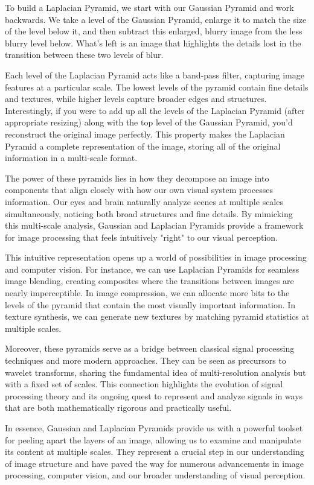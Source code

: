 To build a Laplacian Pyramid, we start with our Gaussian Pyramid and work backwards. We take a level of the Gaussian Pyramid, enlarge it to match the size of the level below it, and then subtract this enlarged, blurry image from the less blurry level below. What's left is an image that highlights the details lost in the transition between these two levels of blur.

Each level of the Laplacian Pyramid acts like a band-pass filter, capturing image features at a particular scale. The lowest levels of the pyramid contain fine details and textures, while higher levels capture broader edges and structures. Interestingly, if you were to add up all the levels of the Laplacian Pyramid (after appropriate resizing) along with the top level of the Gaussian Pyramid, you'd reconstruct the original image perfectly. This property makes the Laplacian Pyramid a complete representation of the image, storing all of the original information in a multi-scale format.

The power of these pyramids lies in how they decompose an image into components that align closely with how our own visual system processes information. Our eyes and brain naturally analyze scenes at multiple scales simultaneously, noticing both broad structures and fine details. By mimicking this multi-scale analysis, Gaussian and Laplacian Pyramids provide a framework for image processing that feels intuitively "right" to our visual perception.

This intuitive representation opens up a world of possibilities in image processing and computer vision. For instance, we can use Laplacian Pyramids for seamless image blending, creating composites where the transitions between images are nearly imperceptible. In image compression, we can allocate more bits to the levels of the pyramid that contain the most visually important information. In texture synthesis, we can generate new textures by matching pyramid statistics at multiple scales.

Moreover, these pyramids serve as a bridge between classical signal processing techniques and more modern approaches. They can be seen as precursors to wavelet transforms, sharing the fundamental idea of multi-resolution analysis but with a fixed set of scales. This connection highlights the evolution of signal processing theory and its ongoing quest to represent and analyze signals in ways that are both mathematically rigorous and practically useful.

In essence, Gaussian and Laplacian Pyramids provide us with a powerful toolset for peeling apart the layers of an image, allowing us to examine and manipulate its content at multiple scales. They represent a crucial step in our understanding of image structure and have paved the way for numerous advancements in image processing, computer vision, and our broader understanding of visual perception.

